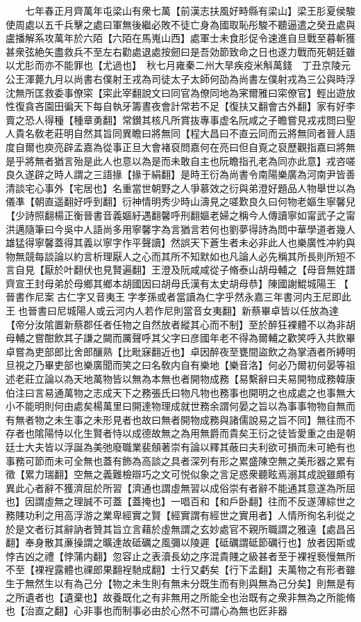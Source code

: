 　　七年春正月齊萬年屯梁山有衆七萬【前漢志扶風好畤縣有梁山】梁王肜夏侯駿使周處以五千兵擊之處曰軍無後繼必敗不徒亡身為國取恥彤駿不聽逼遣之癸丑處與盧播解系攻萬年於六陌【六陌在馬嵬山西】處軍士未食肜促令速進自旦戰至暮斬獲甚衆弦絶矢盡救兵不至左右勸處退處按劒曰是吾効節致命之日也遂力戰而死朝廷雖以尤肜而亦不能罪也【尤過也】　秋七月雍秦二州大旱疾疫米斛萬錢　丁丑京陵元公王渾薨九月以尚書右僕射王戎為司徒太子太師何劭為尚書左僕射戎為三公與時浮沈無所匡救委事僚寀【寀此宰翻說文曰同官為僚同地為宷爾雅曰寀僚官】輕出遊放性復貪吝園田徧天下每自執牙籌晝夜會計常若不足【復扶又翻會古外翻】家有好李賣之恐人得種【種章勇翻】常鑚其核凡所賞抜專事虚名阮咸之子瞻嘗見戎戎問曰聖人貴名敎老莊明自然其旨同異瞻曰將無同【程大昌曰不直云同而云將無同者晉人語度自爾也庾亮辟孟嘉為從事正旦大會褚裒問嘉何在亮曰但自覔之裒歷觀指嘉曰將無是乎將無者猶言殆是此人也意以為是而未敢自主也阮瞻指孔老為同亦此意】戎咨嗟良久遂辟之時人謂之三語掾【掾于絹翻】是時王衍為尚書令南陽樂廣為河南尹皆善清談宅心事外【宅居也】名重當世朝野之人爭慕效之衍與弟澄好題品人物舉世以為儀凖【朝直遥翻好呼到翻】衍神情明秀少時山濤見之嗟歎良久曰何物老嫗生寧馨兒【少詩照翻楊正衡晉書音義嫗紆遇翻馨呼刑翻嫗老婦之稱今人傳讀寧如甯武子之甯洪邁隨筆曰今吳中人語尚多用寧馨字為言猶言若何也劉夢得詩為問中華學道者幾人雄猛得寧馨蓋得其義以寧字作平聲讀】然誤天下蒼生者未必非此人也樂廣性冲約與物無競每談論以約言析理厭人之心而其所不知默如也凡論人必先稱其所長則所短不言自見【厭於叶翻伏也見賢遍翻】王澄及阮咸咸從子脩泰山胡母輔之【母音無姓譜齊宣王封母弟於母鄉其鄉本胡國因曰胡母氏漢有太史胡母恭】陳國謝鯤城陽王【晉書作尼案古仁字又音夷王字孝孫或者當讀為仁字乎然永嘉三年書河内王尼即此王也晉書曰尼城陽人或云河内人若作尼則當音女夷翻】新蔡畢卓皆以任放為達【帝分汝隂置新蔡郡任者任物之自然放者縱其心而不制】至於醉狂裸體不以為非胡母輔之嘗酣飲其子謙之闚而厲聲呼其父字曰彦國年老不得為爾輔之歡笑呼入共飲畢卓嘗為吏部郎比舍郎釀熟【比毗寐翻近也】卓因醉夜至甕間盜飲之為掌酒者所縛明旦視之乃畢吏部也樂廣聞而笑之曰名敎内自有樂地【樂音洛】何必乃爾初何晏等祖述老莊立論以為天地萬物皆以無為本無也者開物成務【易繫辭曰夫易開物成務韓康伯注曰言易通萬物之志成天下之務張氏曰物凡物也務事也開明之也成處之也事無大小不能明則何由處矣楊萬里曰開達物理成就世務余謂何晏之旨以為事事物物自無而有無者物之未生事之未形見者也故曰無者開物成務與諸儒說易之旨不同】無往而不存者也隂陽恃以化生賢者恃以成德故無之為用無爵而貴矣王衍之徒皆愛重之由是朝廷士大夫皆以浮誕為美弛廢職業裴頠著崇有論以釋其蔽曰夫利欲可損而未可絶有也事務可節而未可全無也蓋有飾為高談之具者深列有形之累盛陳空無之美形器之累有徵【累力瑞翻】空無之義難檢辯巧之文可悦似象之言足惑衆聽眩焉溺其成說雖頗有異此心者辭不獲濟屈於所習【濟通也謂虛無習以成俗崇有者辭不能通其意遂為所屈也】因謂虛無之理誠不可蓋【蓋掩也】一唱百和【和戶卧翻】往而不反遂薄綜世之務賤功利之用高浮游之業卑經實之賢【經實謂有經世之實用者】人情所徇名利從之於是文者衍其辭訥者贊其旨立言藉於虛無謂之玄妙處官不親所職謂之雅遠【處昌呂翻】奉身散其亷操謂之曠達故砥礪之風彌以陵遲【砥礪謂砥節礪行也】放者因斯或悖吉凶之禮【悖蒲内翻】忽容止之表瀆長幼之序混貴賤之級甚者至于裸裎䙝慢無所不至【裸裎露體也祼郎果翻裎馳成翻】士行又虧矣【行下孟翻】夫萬物之有形者雖生于無然生以有為己分【物之未生則有無未分既生而有則與無為己分矣】則無是有之所遺者也【遺棄也】故養既化之有非無用之所能全也治既有之衆非無為之所能脩也【治直之翻】心非事也而制事必由於心然不可謂心為無也匠非器